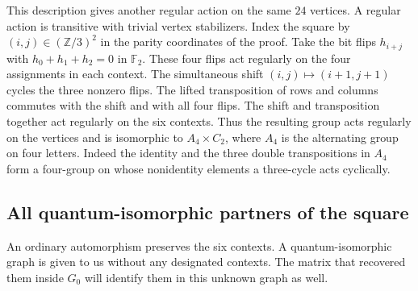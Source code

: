 \documentclass[11pt,reqno]{amsart}
\numberwithin{equation}{section}
\theoremstyle{definition}
\begin{document}
This description gives another regular action on the same $24$ vertices. A regular action is transitive with trivial vertex stabilizers. Index the square by $(i,j)\in(\mathbb Z/3)^2$ in the parity coordinates of the proof. Take the bit flips $h_{i+j}$ with $h_0+h_1+h_2=0$ in $\mathbb F_2$. These four flips act regularly on the four assignments in each context. The simultaneous shift $(i,j)\mapsto(i+1,j+1)$ cycles the three nonzero flips. The lifted transposition of rows and columns commutes with the shift and with all four flips. The shift and transposition together act regularly on the six contexts. Thus the resulting group acts regularly on the vertices and is isomorphic to $A_4\times C_2$, where $A_4$ is the alternating group on four letters. Indeed the identity and the three double transpositions in $A_4$ form a four-group on whose nonidentity elements a three-cycle acts cyclically.

\subsection{All quantum-isomorphic partners of the square}
An ordinary automorphism preserves the six contexts. A quantum-isomorphic graph is given to us without any designated contexts. The matrix that recovered them inside $G_0$ will identify them in this unknown graph as well.
\end{document}
